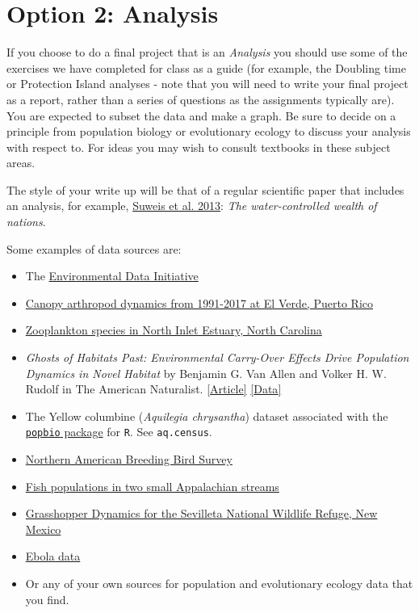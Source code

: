 \documentclass[]{book}
\begin{document}
\section{Option 2: Analysis}\label{option-2-analysis}

If you choose to do a final project that is an \emph{Analysis} you
should use some of the exercises we have completed for class as a guide
(for example, the Doubling time or Protection Island analyses - note
that you will need to write your final project as a report, rather than
a series of questions as the assignments typically are). You are
expected to subset the data and make a graph. Be sure to decide on a
principle from population biology or evolutionary ecology to discuss
your analysis with respect to. For ideas you may wish to consult
textbooks in these subject areas.

The style of your write up will be that of a regular scientific paper
that includes an analysis, for example,
\href{https://www.pnas.org/content/110/11/4230}{Suweis et al. 2013}:
\emph{The water-controlled wealth of nations}.

Some examples of data sources are:

\begin{itemize}
\item
  The \href{https://portal.edirepository.org/nis/home.jsp}{Environmental
  Data Initiative}
\item
  \href{https://portal.edirepository.org/nis/metadataviewer?packageid=knb-lter-luq.96.2410865}{Canopy
  arthropod dynamics from 1991-2017 at El Verde, Puerto Rico}
\item
  \href{https://portal.edirepository.org/nis/mapbrowse?packageid=knb-lter-nin.2.1}{Zooplankton
  species in North Inlet Estuary, North Carolina}
\item
  \emph{Ghosts of Habitats Past: Environmental Carry-Over Effects Drive
  Population Dynamics in Novel Habitat} by Benjamin G. Van Allen and
  Volker H. W. Rudolf in The American Naturalist.
  \href{https://www.journals.uchicago.edu/doi/10.1086/670127?mobileUi=0}{{[}Article{]}}
  \href{https://datadryad.org/stash/dataset/doi:10.5061/dryad.t4g3r}{{[}Data{]}}
\item
  The Yellow columbine (\emph{Aquilegia chrysantha}) dataset associated
  with the
  \href{https://cran.r-project.org/web/packages/popbio/index.html}{\texttt{popbio}
  package} for \texttt{R}. See \texttt{aq.census}.
\item
  \href{https://www.pwrc.usgs.gov/BBS/RawData/}{Northern American
  Breeding Bird Survey}
\item
  \href{https://portal.edirepository.org/nis/mapbrowse?packageid=knb-lter-cwt.3026.13}{Fish
  populations in two small Appalachian streams}
\item
  \href{https://portal.edirepository.org/nis/mapbrowse?packageid=knb-lter-sev.106.214968}{Grasshopper
  Dynamics for the Sevilleta National Wildlife Refuge, New Mexico}
\item
  \href{https://apps.who.int/gho/data/node.ebola-sitrep.quick-downloads?lang=en}{Ebola
  data}
\item
  Or any of your own sources for population and evolutionary ecology
  data that you find.
\end{itemize}
\end{document}
